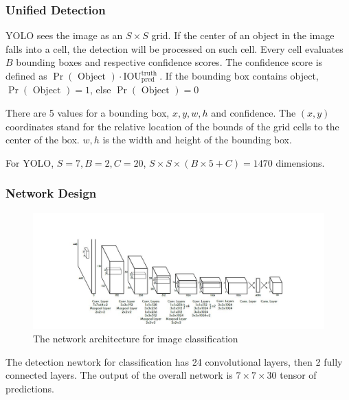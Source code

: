 \documentclass[catalog.tex]{subfiles}
\begin{document}
\subsubsection*{Unified Detection}
\par YOLO sees the image as an $S \times S$ grid. If the center of an object in the image falls into a cell, the detection will be processed on such cell. Every cell evaluates $B$ bounding boxes and respective confidence scores. The confidence score is defined as $\operatorname{Pr}(\text { Object }) \cdot \mathrm{IOU}_{\text {pred }}^{\text {truth }}$. If the bounding box contains object,$\operatorname{Pr}(\text { Object })=1$, else $\operatorname{Pr}(\text { Object })=0$
\par There are 5 values for a bounding box, $x,y,w,h$ and confidence. The $(x,y)$ coordinates stand for the relative location of the bounds of the grid cells to the center of the box. $w,h$ is the width and height of the bounding box.
\par For YOLO, $S=7,B=2,C=20$, $S \times S \times (B \times 5 + C)=1470$ dimensions. ~\cite{redmon2015look}
\subsubsection*{Network Design}
\begin{figure}[h]
	\includegraphics[width=\textwidth]{problem-117_b.jpg}
	\caption{The network architecture for image classification}
\end{figure}
The detection newtork for classification has 24 convolutional layers, then 2 fully connected layers. The output of the overall network is $ 7 \times 7 \times 30$ tensor of predictions.
\end{document}
